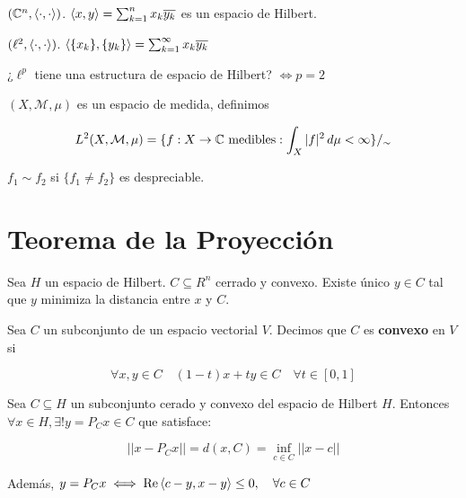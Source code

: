 \begin{fexample}
    $(\mathbb{C}^n,\left\langle \cdot,\cdot\right\rangle)$. $\left\langle x,y\right\rangle=\sum_{k=1}^n x_k\overline{y_k}$ es un espacio de Hilbert.
\end{fexample}

\begin{fexample}
    $(\ell^2,\left\langle \cdot,\cdot\right\rangle)$. $\left\langle \{x_k\},\{y_k\}\right\rangle=\sum_{k=1}^\infty x_k\overline{y_k}$
\end{fexample}

¿$\ell^p$ tiene una estructura de espacio de Hilbert? $\iff p=2$

\begin{fexample}
    $(X,\mathcal{M},\mu)$ es un espacio de medida, definimos 

    \[L^2(X,\mathcal{M},\mu)=\{f:X\to\mathbb{C}\text{ medibles}:\int_X|f|^2\,d\mu<\infty\}/_\sim\]

    $f_1\sim f_2$ si $\{f_1\neq f_2\}$ es despreciable.
\end{fexample}

\section{Teorema de la Proyección}

Sea $H$ un espacio de Hilbert. $C\subseteq R^n$ cerrado y convexo. Existe único $y\in C$ tal que $y$ minimiza la distancia entre $x$ y $C$.

\begin{fdefinition}
    Sea $C$ un subconjunto de un espacio vectorial $V$. Decimos que $C$ es \textbf{convexo} en $V$ si

    \[\forall x,y\in C\quad (1-t)x+ty\in C\quad \forall t\in [0,1]\]
\end{fdefinition}

\begin{ftheorem}
    Sea $C\subseteq H$ un subconjunto cerado y convexo del espacio de Hilbert $H$. Entonces $\forall x\in H,\exists! y=P_C x\in C$ que satisface:

    \[||x-P_C x||=d(x,C)=\inf_{c\in C} ||x-c||\]

    Además, $y=P_C x\iff \operatorname{Re} \left\langle c-y,x-y\right\rangle\leq 0,\quad \forall c\in C$
\end{ftheorem}

